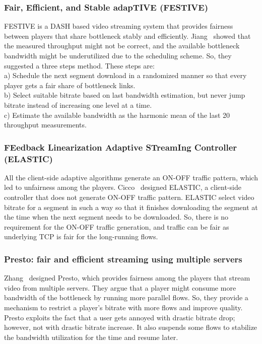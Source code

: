 \subsubsection{Fair, Efficient, and Stable adapTIVE (FESTIVE)}
FESTIVE\cite{10.1145/2413176.2413189} is a DASH based video streaming system that provides fairness between players that share bottleneck stably and efficiently. Jiang \etal\ showed that the measured throughput might not be correct, and the available bottleneck bandwidth might be underutilized due to the scheduling scheme. So, they suggested a three steps method. These steps are:\\
a) Schedule the next segment download in a randomized manner so that every player gets a fair share of bottleneck links. \\
b) Select suitable bitrate based on last bandwidth estimation, but never jump bitrate instead of increasing one level at a time. \\
c) Estimate the available bandwidth as the harmonic mean of the last 20 throughput measurements.


\subsubsection{FEedback Linearization Adaptive STreamIng Controller (ELASTIC)}
All the client-side adaptive algorithms generate an ON-OFF traffic pattern, which led to unfairness among the players. Cicco \etal\ designed ELASTIC\cite{6691442}, a client-side controller that does not generate ON-OFF traffic pattern. ELASTIC select video bitrate for a segment in such a way so that it finishes downloading the segment at the time when the next segment needs to be downloaded. So, there is no requirement for the ON-OFF traffic generation, and traffic can be fair as underlying TCP is fair for the long-running flows.

\subsubsection{Presto: fair and efficient streaming using multiple servers}
Zhang \etal\ designed Presto\cite{7249417}, which provides fairness among the players that stream video from multiple servers. They argue that a player might consume more bandwidth of the bottleneck by running more parallel flows. So, they provide a mechanism to restrict a player's bitrate with more flows and improve quality. Presto exploits the fact that a user gets annoyed with drastic bitrate drop; however, not with drastic bitrate increase\cite{10.1145/2018602.2018611}. It also suspends some flows to stabilize the bandwidth utilization for the time and resume later.

